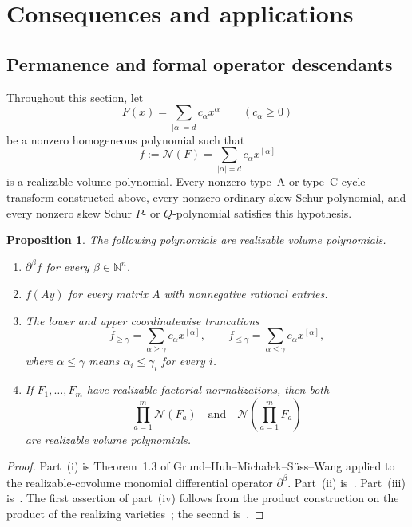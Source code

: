 \documentclass[11pt,a4paper,oneside]{amsart}
\numberwithin{equation}{section}
\newtheorem{proposition}[theorem]{Proposition}
\theoremstyle{definition}
\theoremstyle{remark}
\newcommand{\N}{\mathbb N}
\newcommand{\cN}{\mathcal N}
\newcommand{\abs}[1]{\lvert#1\rvert}
\begin{document}
\section{Consequences and applications}\label{sec:applications}

\subsection{Permanence and formal operator descendants}

Throughout this section, let
\begin{equation}\label{eq:generic-F}
 F(x)=\sum_{\abs\alpha=d}c_\alpha x^\alpha
 \qquad(c_\alpha\geq0)
\end{equation}
be a nonzero homogeneous polynomial such that
\[
 f:=\cN(F)=\sum_{\abs\alpha=d}c_\alpha x^{[\alpha]}
\]
is a realizable volume polynomial.  Every nonzero type~A or type~C cycle transform constructed above, every nonzero ordinary skew Schur polynomial, and every nonzero skew Schur $P$- or $Q$-polynomial satisfies this hypothesis.

\begin{proposition}\label{prop:permanence}
The following polynomials are realizable volume polynomials.
\begin{enumerate}[label=\textup{(\roman*)}]
\item $\partial^\beta f$ for every $\beta\in\N^n$.
\item $f(Ay)$ for every matrix $A$ with nonnegative rational entries.
\item The lower and upper coordinatewise truncations
\[
 f_{\geq\gamma}=\sum_{\alpha\geq\gamma}c_\alpha x^{[\alpha]},
 \qquad
 f_{\leq\gamma}=\sum_{\alpha\leq\gamma}c_\alpha x^{[\alpha]},
\]
where $\alpha\leq\gamma$ means $\alpha_i\leq\gamma_i$ for every $i$.
\item If $F_1,\ldots,F_m$ have realizable factorial normalizations, then both
\[
 \prod_{a=1}^m\cN(F_a)
 \quad\text{and}\quad
 \cN\left(\prod_{a=1}^mF_a\right)
\]
are realizable volume polynomials.
\end{enumerate}
\end{proposition}

\begin{proof}
Part~(i) is Theorem~1.3 of Grund--Huh--Micha{\l}ek--S\"uss--Wang applied to the realizable-covolume monomial differential operator $\partial^\beta$.  Part~(ii) is~\cite[Proposition~2.8]{GHMSW25}.  Part~(iii) is~\cite[Corollary~3.3]{GHMSW25}.  The first assertion of part~(iv) follows from the product construction on the product of the realizing varieties~\cite[Corollary~2.9]{GHMSW25}; the second is~\cite[Corollary~2.6]{GHMSW25}.
\end{proof}
\end{document}
